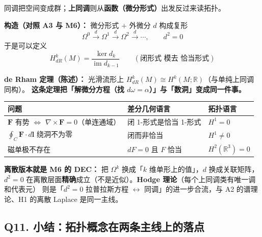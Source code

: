同调把空间变成群；\textbf{上同调}则从\textbf{函数（微分形式）}出发反过来读拓扑。

\textbf{构造（对照 A3 与 M6）：} 微分形式 $+$ 外微分 $d$ 构成复形
\[
\Omega^0\xrightarrow{\ d\ }\Omega^1\xrightarrow{\ d\ }\Omega^2\xrightarrow{\ d\ }\cdots,
\qquad d^2=0
\]
于是可以定义
\[
H^k_{dR}(M)=\frac{\ker d_k}{\operatorname{im}d_{k-1}}
\qquad(\text{闭形式 模去 恰当形式})
\]

\textbf{de Rham 定理（陈述）：} 光滑流形上 $H^k_{dR}(M)\cong H^k(M;\mathbb R)$（与单纯上同调同构）。
\textbf{这条定理把「解微分方程（找 $d\omega=\alpha$）」与「数洞」变成同一件事。}

\begin{center}
\begin{tabular}{lll}
\toprule
\textbf{问题} & \textbf{差分几何语言} & \textbf{拓扑语言} \\
\midrule
$\mathbf F$ 有势 $\iff$ $\nabla\times\mathbf F=0$（单连通域） & 闭 1-形式是恰当 1-形式 & $H^1=0$ \\
$\oint_C\mathbf F\cdot d\mathbf l$ 绕洞不为零 & 闭而非恰当 & $H^1\ne0$ \\
磁单极不存在 & $dF=0$ 且 $F$ 恰当 & $H^2(\mathbb R^3)=0$ \\
\bottomrule
\end{tabular}
\end{center}

\textbf{离散版本就是 M6 的 DEC：} 把 $\Omega^k$ 换成「$k$ 维单形上的值」，$d$ 换成关联矩阵，
$d^2=0$ 在离散层面\textbf{精确}成立（不是近似）。\textbf{Hodge 理论}（每个上同调类有唯一调和代表元）
则是「$d^2=0$ 拉普拉斯方程 $\leftrightarrow$ 同调」的进一步合流，与 A2 的谱理论、H1 的离散 Laplace 是同一主线。

\subsection{Q11. 小结：拓扑概念在两条主线上的落点}

